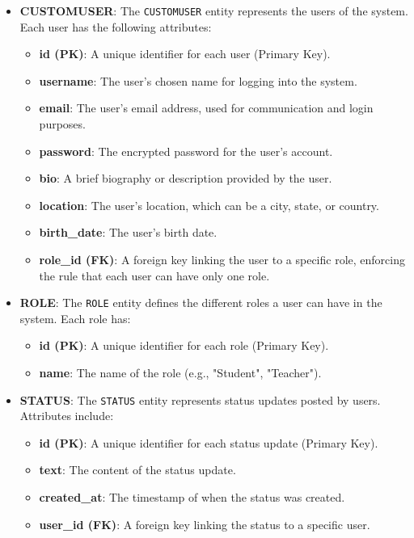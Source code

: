 \begin{itemize}
    \item \textbf{CUSTOMUSER}: The \texttt{CUSTOMUSER} entity represents the users of the system. Each user has the following attributes:
    \begin{itemize}
        \item \textbf{id (PK)}: A unique identifier for each user (Primary Key).
        \item \textbf{username}: The user's chosen name for logging into the system.
        \item \textbf{email}: The user's email address, used for communication and login purposes.
        \item \textbf{password}: The encrypted password for the user’s account.
        \item \textbf{bio}: A brief biography or description provided by the user.
        \item \textbf{location}: The user's location, which can be a city, state, or country.
        \item \textbf{birth\_date}: The user's birth date.
        \item \textbf{role\_id (FK)}: A foreign key linking the user to a specific role, enforcing the rule that each user can have only one role.
    \end{itemize}

    \item \textbf{ROLE}: The \texttt{ROLE} entity defines the different roles a user can have in the system. Each role has:
    \begin{itemize}
        \item \textbf{id (PK)}: A unique identifier for each role (Primary Key).
        \item \textbf{name}: The name of the role (e.g., "Student", "Teacher").
    \end{itemize}

    \item \textbf{STATUS}: The \texttt{STATUS} entity represents status updates posted by users. Attributes include:
    \begin{itemize}
        \item \textbf{id (PK)}: A unique identifier for each status update (Primary Key).
        \item \textbf{text}: The content of the status update.
        \item \textbf{created\_at}: The timestamp of when the status was created.
        \item \textbf{user\_id (FK)}: A foreign key linking the status to a specific user.
    \end{itemize}


\end{itemize}
